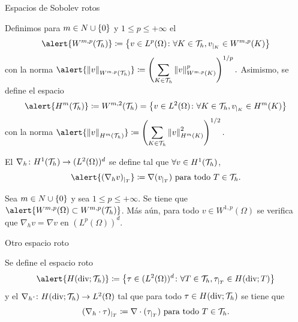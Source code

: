 \begin{frame}[allowframebreaks]{Espacios de Sobolev rotos}
\begin{definicion}
	Definimos para $m\in\relax N\cup\{0\}$ y $1\leq p\leq+\infty$ el 
	$$\alert{W^{m,p}(\T_h)}\coloneqq\left\{v\in L^p(\Omega)\colon \forall K\in\T_h, v_{|_K}\in W^{m,p}(K)\right\}$$
	con la norma
	$\displaystyle\alert{\norma{v}_{W^{m,p}(\T_h)}}\coloneqq\left(\sum_{K\in\T_h} \norma{v}^p_{W^{m,p}(K)}\right)^{1/p}.$
	Asimismo, se define el espacio
	$$\alert{H^m(\mathcal{T}_h)}\coloneqq W^{m,2}(\T_h)= \left\{v\in L^2(\Omega)\colon \forall K\in\T_h, v_{|_K}\in H^m(K) \right\}$$
	con la norma
	$\displaystyle\alert{\norma{v}_{H^m(\T_h)}}\coloneqq \left(\sum_{K\in\T_h}\norma{v}^2_{H^m(K)} \right)^{1/2}.$
\end{definicion}
\framebreak
\begin{definicion}
	El  $\nabla_h\colon H^1(\mathcal{T}_h)\to (L^2(\Omega))^d$ se define tal que $\forall v\in H^1(\mathcal{T}_h)$, $$\alert{(\nabla_h v)_{|_T}}\coloneqq\nabla(v_{|_T})\text{ para todo } T\in\T_h.$$
\end{definicion}

\begin{lemma}
	\label{lemma:inclusion_sobolev}
	Sea $m\in\relax N\cup\{0\}$ y sea $1\leq p\leq+\infty$. Se tiene que $\alert{W^{m,p}(\Omega)\subset W^{m,p}(\T_h)}$. Más aún, para todo $v\in W^{1,p}(\Omega)$ se verifica que $\nabla_h v=\nabla v$ en $\left(L^p(\Omega)\right)^d$.
\end{lemma}
\end{frame}

\begin{frame}{Otro espacio roto}
\begin{definicion}
	Se define el espacio roto $$\alert{H(\text{div};\T_h)}\coloneqq\left\{\tau\in(L^2(\Omega))^d\colon \forall T\in\T_h, \tau_{|_T}\in H(\text{div};T)\right\}$$ y el  $\nabla_h\cdot\colon H(\text{div};\mathcal{T}_h)\to L^2(\Omega)$ tal que para todo $\tau\in H(\text{div};\mathcal{T}_h)$ se tiene que $$(\nabla_h\cdot\tau)_{|_T}\coloneqq \nabla\cdot(\tau_{|_T})\text{ para todo }T\in\mathcal{T}_h.$$
\end{definicion}

\end{frame}

